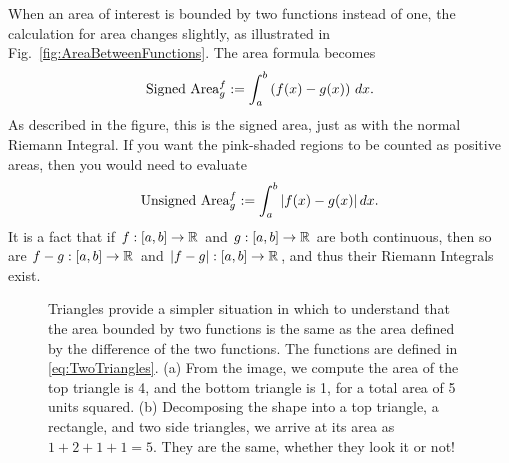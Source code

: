 \bigskip

When an area of interest is bounded by two functions instead of one, the calculation for area changes slightly, as illustrated in Fig.~\ref{fig:AreaBetweenFunctions}. The area formula becomes
\begin{equation}
    \label{eq:SignedAreaBetweenFunctions}
    {\rm Signed~ Area}_g^f := \int_{a}^{b} \left( f(x) - g(x) \right)\, dx.
\end{equation}
As described in the figure, this is the signed area, just as with the normal Riemann Integral. If you want the pink-shaded regions to be counted as positive areas, then you would need to evaluate
\begin{equation}
    \label{eq:PositiveAreaBetweenFunctions}
    {\rm Unsigned~ Area}_g^f := \int_{a}^{b} |f(x) -g(x)|\, dx.
\end{equation}
It is a fact that if $f:[a, b] \to \mathbb R$ and $g:[a, b] \to \mathbb R$ are both continuous, then so are $f-g:[a, b] \to \mathbb R$ and $|f-g|:[a, b] \to \mathbb R$, and thus their Riemann Integrals exist.

\bigskip

\begin{figure}[hbt]%
\centering
{}%
\hspace{5pt}%
\centering
{}%
    \caption[]{Triangles provide a simpler situation in which to understand that the area bounded by two functions is the same as the area defined by the difference of the two functions. The functions are defined in \eqref{eq:TwoTriangles}. (a) From the image, we compute the area of the top triangle is 4, and the bottom triangle is 1, for a total area of 5 units squared. (b) Decomposing the shape into a top triangle, a rectangle, and two side triangles, we arrive at its area as $1 + 2 + 1 + 1 = 5$. They are the same, whether they look it or not!}
    \label{fig:AreaBetweenTwoTriangels}
\end{figure}

